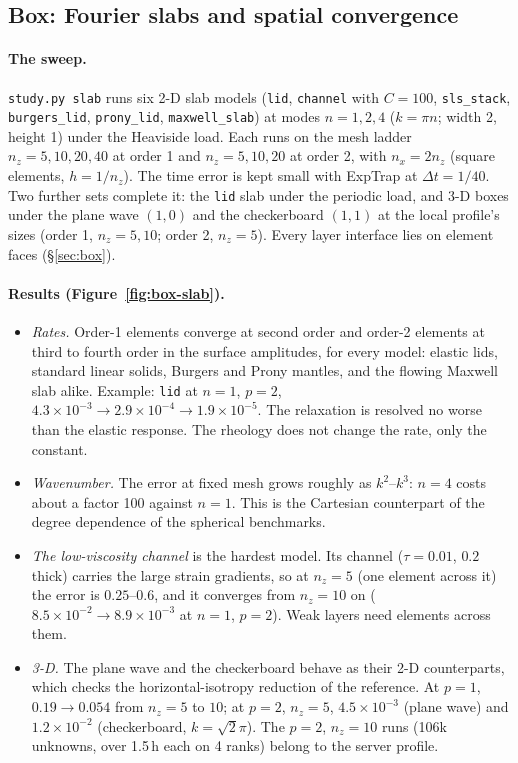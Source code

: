 \documentclass[11pt]{article}
\numberwithin{equation}{section}
\newcommand{\code}[1]{\texttt{#1}}
\begin{document}
\subsection{Box: Fourier slabs and spatial convergence}
\label{sec:box-slab}

\paragraph{The sweep.}
\code{study.py slab} runs six 2-D slab models (\code{lid}, \code{channel}
with $C=100$, \code{sls\_stack}, \code{burgers\_lid}, \code{prony\_lid},
\code{maxwell\_slab}) at modes $n=1,2,4$ ($k=\pi n$; width 2, height 1)
under the Heaviside load. Each runs on the mesh ladder $n_z=5,10,20,40$
at order 1 and $n_z=5,10,20$ at order 2, with $n_x=2n_z$ (square
elements, $h=1/n_z$). The time error is kept small with ExpTrap at
$\Delta t=1/40$. Two further sets complete it: the \code{lid} slab under
the periodic load, and 3-D boxes under the plane wave $(1,0)$ and the
checkerboard $(1,1)$ at the local profile's sizes (order 1, $n_z=5,10$;
order 2, $n_z=5$). Every layer interface lies on element faces
(\S\ref{sec:box}).

\paragraph{Results (Figure~\ref{fig:box-slab}).}
\begin{itemize}[leftmargin=*]
\item \emph{Rates.} Order-1 elements converge at second order and
  order-2 elements at third to fourth order in the surface amplitudes,
  for every model: elastic lids, standard linear solids, Burgers and
  Prony mantles, and the flowing Maxwell slab alike. Example: \code{lid}
  at $n=1$, $p=2$, $4.3\times10^{-3}\to2.9\times10^{-4}\to1.9\times10^{-5}$.
  The relaxation is resolved no worse than the elastic response. The
  rheology does not change the rate, only the constant.
\item \emph{Wavenumber.} The error at fixed mesh grows roughly as
  $k^2$--$k^3$: $n=4$ costs about a factor 100 against $n=1$. This is the
  Cartesian counterpart of the degree dependence of the spherical
  benchmarks.
\item \emph{The low-viscosity channel} is the hardest model. Its channel
  ($\tau=0.01$, $0.2$ thick) carries the large strain gradients, so at
  $n_z=5$ (one element across it) the error is $0.25$--$0.6$, and it
  converges from $n_z=10$ on ($8.5\times10^{-2}\to8.9\times10^{-3}$ at
  $n=1$, $p=2$). Weak layers need elements across them.
\item \emph{3-D.} The plane wave and the checkerboard behave as their
  2-D counterparts, which checks the horizontal-isotropy reduction of the
  reference. At $p=1$, $0.19\to0.054$ from $n_z=5$ to $10$; at $p=2$,
  $n_z=5$, $4.5\times10^{-3}$ (plane wave) and $1.2\times10^{-2}$
  (checkerboard, $k=\sqrt2\pi$). The $p=2$, $n_z=10$ runs (106k
  unknowns, over 1.5\,h each on 4 ranks) belong to the server profile.
\end{itemize}
\end{document}
